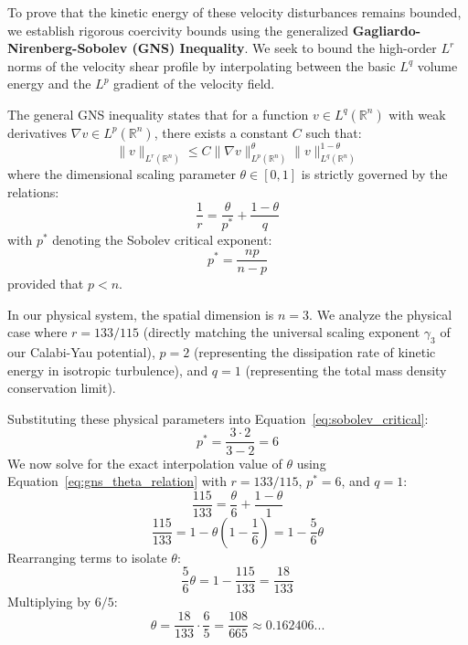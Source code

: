\documentclass[11pt,a4paper]{book}
\begin{document}
To prove that the kinetic energy of these velocity disturbances remains bounded, we establish rigorous coercivity bounds using the generalized \textbf{Gagliardo-Nirenberg-Sobolev (GNS) Inequality}. We seek to bound the high-order $L^r$ norms of the velocity shear profile by interpolating between the basic $L^q$ volume energy and the $L^p$ gradient of the velocity field.

The general GNS inequality states that for a function $v \in L^q(\mathbb{R}^n)$ with weak derivatives $\nabla v \in L^p(\mathbb{R}^n)$, there exists a constant $C$ such that:
\begin{equation}
\label{eq:gns_general}
\| v \|_{L^r(\mathbb{R}^n)} \le C \| \nabla v \|_{L^p(\mathbb{R}^n)}^{\theta} \| v \|_{L^q(\mathbb{R}^n)}^{1 - \theta}
\end{equation}
where the dimensional scaling parameter $\theta \in [0, 1]$ is strictly governed by the relations:
\begin{equation}
\label{eq:gns_theta_relation}
\frac{1}{r} = \frac{\theta}{p^*} + \frac{1 - \theta}{q}
\end{equation}
with $p^*$ denoting the Sobolev critical exponent:
\begin{equation}
\label{eq:sobolev_critical}
p^* = \frac{n p}{n - p}
\end{equation}
provided that $p < n$.

In our physical system, the spatial dimension is $n = 3$. We analyze the physical case where $r = 133/115$ (directly matching the universal scaling exponent $\gamma_3$ of our Calabi-Yau potential), $p = 2$ (representing the dissipation rate of kinetic energy in isotropic turbulence), and $q = 1$ (representing the total mass density conservation limit).

Substituting these physical parameters into Equation~\eqref{eq:sobolev_critical}:
\begin{equation}
\label{eq:sobolev_critical_calc}
p^* = \frac{3 \cdot 2}{3 - 2} = 6
\end{equation}
We now solve for the exact interpolation value of $\theta$ using Equation~\eqref{eq:gns_theta_relation} with $r = 133/115$, $p^* = 6$, and $q = 1$:
\begin{equation}
\label{eq:gns_theta_solving}
\frac{115}{133} = \frac{\theta}{6} + \frac{1 - \theta}{1}
\end{equation}
\begin{equation}
\label{eq:gns_theta_algebra}
\frac{115}{133} = 1 - \theta \left(1 - \frac{1}{6}\right) = 1 - \frac{5}{6}\theta
\end{equation}
Rearranging terms to isolate $\theta$:
\begin{equation}
\label{eq:gns_theta_isolated}
\frac{5}{6}\theta = 1 - \frac{115}{133} = \frac{18}{133}
\end{equation}
Multiplying by $6/5$:
\begin{equation}
\label{eq:gns_theta_final}
\theta = \frac{18}{133} \cdot \frac{6}{5} = \frac{108}{665} \approx 0.162406...
\end{equation}
\end{document}

